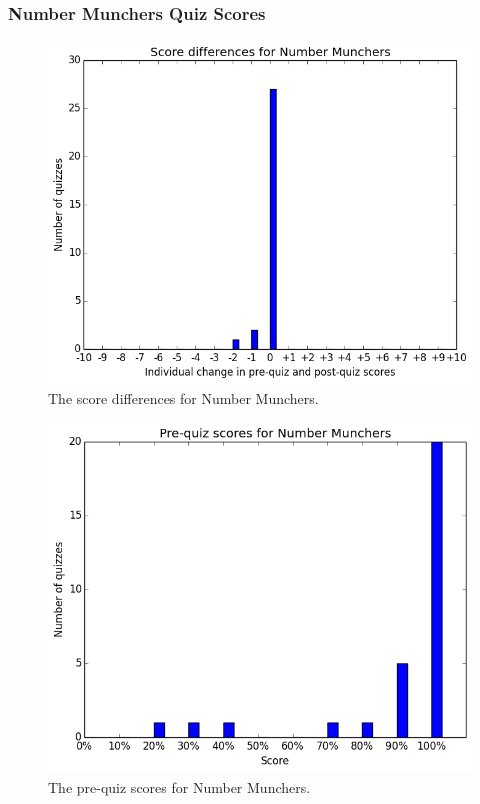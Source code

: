		\subsubsection{Number Munchers Quiz Scores}

			\begin{figure}[h!] 
			\centering 
			\includegraphics[height=0.33\textheight]{munchers_results.png} 
			\caption{The score differences for Number Munchers.}
			\end{figure}

			\begin{figure}[h!] 
			\centering 
			\includegraphics[height=0.33\textheight]{munchers_pre.png} 
			\caption{The pre-quiz scores for Number Munchers.}
			\end{figure}


